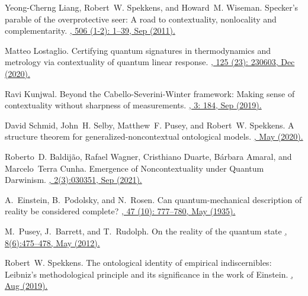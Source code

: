 \documentclass[a4paper,twocolumn,11pt,accepted=2024-01-17]{quantumarticle}
\begin{document}
\begin{thebibliography}{100}
Yeong-Cherng Liang, Robert~W. Spekkens, and Howard~M. Wiseman.
\newblock Specker’s parable of the overprotective seer: {A} road to contextuality, nonlocality and complementarity.
\href{https://doi.org/10.1016/j.physrep.2011.05.001}{, 506 (1-2): 1--39, Sep (2011).}

Matteo Lostaglio.
\newblock Certifying quantum signatures in thermodynamics and metrology via
  contextuality of quantum linear response.
\href{https://doi.org/10.1103/PhysRevLett.125.230603}{, 125 (23): 230603, Dec (2020).}

Ravi Kunjwal.
\newblock Beyond the {C}abello-{S}everini-{W}inter framework: {M}aking sense of contextuality without sharpness of measurements.
\href{https://doi.org/10.22331/q-2019-09-09-184}{, 3: 184, Sep (2019).}

David Schmid, John~H. Selby, Matthew~F. Pusey, and Robert~W. Spekkens.
\newblock A structure theorem for generalized-noncontextual ontological models.
\href{https://doi.org/10.48550/arXiv.2005.07161}{, May (2020).}

Roberto~D. Baldijão, Rafael Wagner, Cristhiano Duarte, Bárbara Amaral, and Marcelo~Terra Cunha.
\newblock Emergence of {N}oncontextuality under {Q}uantum {D}arwinism.
\href{https://doi.org/10.1103/PRXQuantum.2.030351}{, 2(3):030351, Sep (2021).}

A.~Einstein, B.~Podolsky, and N.~Rosen.
\newblock Can quantum-mechanical description of reality be considered complete?
\href{https://doi.org/10.1103/PhysRev.47.777}{, 47 (10): 777--780, May (1935).}

M.~Pusey, J.~Barrett, and T.~Rudolph.
\newblock On the reality of the quantum state
\href{https://doi.org/10.1038/nphys2309}{, 8(6):475--478, May (2012).}

Robert~W. Spekkens.
\newblock The ontological identity of empirical indiscernibles: {L}eibniz's
  methodological principle and its significance in the work of {E}instein.
\href{https://doi.org/10.48550/arXiv.1909.04628}{, Aug (2019).}


\end{thebibliography}
\end{document}
